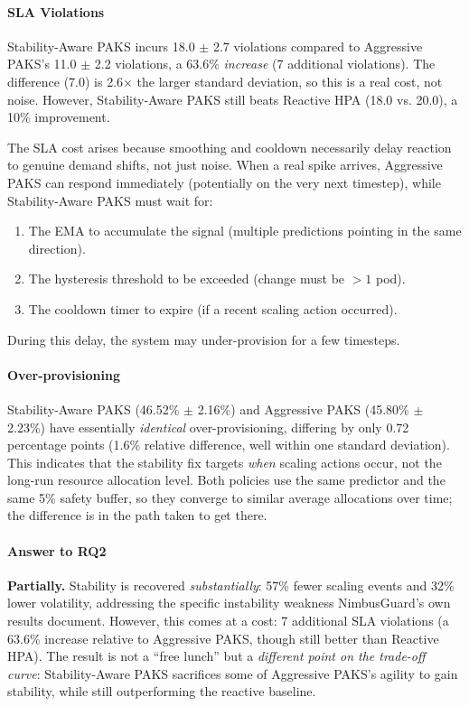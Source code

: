 \paragraph{SLA Violations} Stability-Aware PAKS incurs 18.0 $\pm$ 2.7 violations compared to Aggressive PAKS's 11.0 $\pm$ 2.2 violations, a 63.6\% \emph{increase} (7 additional violations). The difference (7.0) is 2.6× the larger standard deviation, so this is a real cost, not noise. However, Stability-Aware PAKS still beats Reactive HPA (18.0 vs. 20.0), a 10\% improvement.

The SLA cost arises because smoothing and cooldown necessarily delay reaction to genuine demand shifts, not just noise. When a real spike arrives, Aggressive PAKS can respond immediately (potentially on the very next timestep), while Stability-Aware PAKS must wait for:
\begin{enumerate}
  \item The EMA to accumulate the signal (multiple predictions pointing in the same direction).
  \item The hysteresis threshold to be exceeded (change must be $>1$ pod).
  \item The cooldown timer to expire (if a recent scaling action occurred).
\end{enumerate}
During this delay, the system may under-provision for a few timesteps.

\paragraph{Over-provisioning} Stability-Aware PAKS (46.52\% $\pm$ 2.16\%) and Aggressive PAKS (45.80\% $\pm$ 2.23\%) have essentially \emph{identical} over-provisioning, differing by only 0.72 percentage points (1.6\% relative difference, well within one standard deviation). This indicates that the stability fix targets \emph{when} scaling actions occur, not the long-run resource allocation level. Both policies use the same predictor and the same 5\% safety buffer, so they converge to similar average allocations over time; the difference is in the path taken to get there.

\paragraph{Answer to RQ2} \textbf{Partially.} Stability is recovered \emph{substantially}: 57\% fewer scaling events and 32\% lower volatility, addressing the specific instability weakness NimbusGuard's own results document. However, this comes at a cost: 7 additional SLA violations (a 63.6\% increase relative to Aggressive PAKS, though still better than Reactive HPA). The result is not a ``free lunch'' but a \emph{different point on the trade-off curve}: Stability-Aware PAKS sacrifices some of Aggressive PAKS's agility to gain stability, while still outperforming the reactive baseline.

